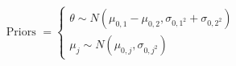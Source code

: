\documentclass[preview]{standalone}
\begin{document}
\begin{align*}
\text{Priors } = \begin{cases}\theta \sim N(\mu_{0,1} - \mu_{0,2},\sigma_{0,1^2} + \sigma_{0,2^2}) \\\mu_j \sim N(\mu_{0,j},\sigma_{0,j^2})\end{cases}
\end{align*}
\end{document}
